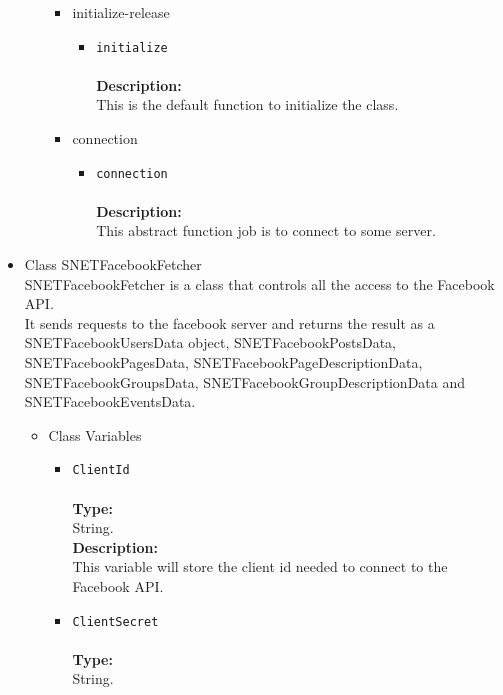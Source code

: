 \begin{itemize}
\begin{itemize}
\begin{itemize}
\item initialize-release
\label{sec-1-4-1-1-3-2}%
\begin{itemize}
\item \verb~initialize~\\\\
\textbf{Description:}\\
      This is the default function to initialize the class.
\end{itemize}


\item connection
\label{sec-1-4-1-1-3-3}%
\begin{itemize}
\item \verb~connection~\\\\
\textbf{Description:}\\
      This abstract function job is to connect to some server.
\end{itemize}


\end{itemize} %
\end{itemize} %

\item Class SNETFacebookFetcher\\
\label{sec-1-4-1-2}%
SNETFacebookFetcher is a class that controls all the access to the Facebook API.\\
   
   It sends requests to the facebook server and returns the result as a SNETFacebookUsersData object, SNETFacebookPostsData, SNETFacebookPagesData, SNETFacebookPageDescriptionData, SNETFacebookGroupsData, SNETFacebookGroupDescriptionData and SNETFacebookEventsData.

\begin{itemize}

\item Class Variables
\label{sec-1-4-1-2-1}%
\begin{itemize}
\item \verb~ClientId~\\\\
\textbf{Type:}\\
     String.\\

     \textbf{Description:}\\
     This variable will store the client id needed to connect to the Facebook API.\\
\item \verb~ClientSecret~\\\\
\textbf{Type:}\\
     String.\\


\end{itemize}
\end{itemize}
\end{itemize}
